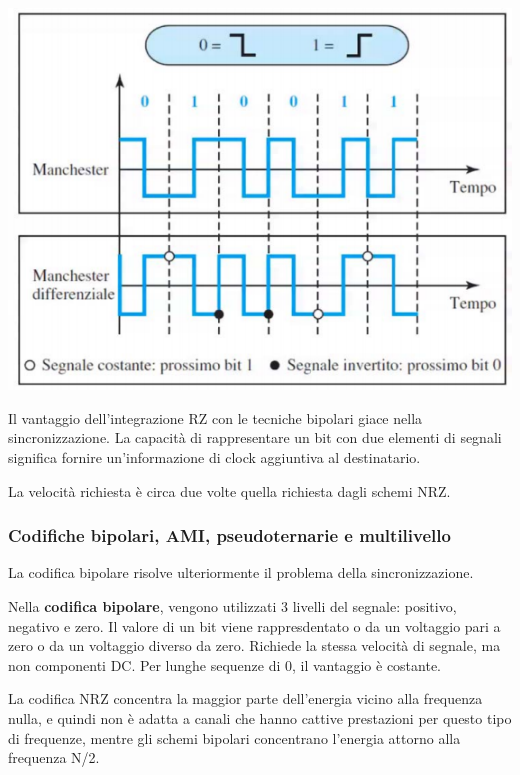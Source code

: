             \begin{center}
                \includegraphics[scale=0.5]{images/Manchesters.png}
            \end{center}
            
            Il vantaggio dell'integrazione RZ con le tecniche bipolari giace nella sincronizzazione. La capacità di rappresentare un bit con due elementi di segnali significa fornire un'informazione di clock aggiuntiva al destinatario. 
            
            La velocità richiesta è circa due volte quella richiesta dagli schemi NRZ.
        
        \subsubsection{Codifiche bipolari, AMI, pseudoternarie e multilivello}
        
            La codifica bipolare risolve ulteriormente il problema della sincronizzazione.
        
            Nella \textbf{codifica bipolare}, vengono utilizzati 3 livelli del segnale: positivo, negativo e zero. Il valore di un bit viene rappresdentato o da un voltaggio pari a zero o da un voltaggio diverso da zero. Richiede la stessa velocità di segnale, ma non componenti DC. Per lunghe sequenze di 0, il vantaggio è costante. 
            
            La codifica NRZ concentra la maggior parte dell'energia vicino alla frequenza nulla, e quindi non è adatta a canali che hanno cattive prestazioni per questo tipo di frequenze, mentre gli schemi bipolari concentrano l'energia attorno alla frequenza N/2.
            
